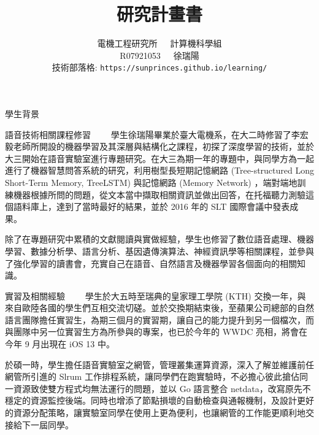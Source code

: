\documentclass[12pt,UTF8,fntef]{article}
\title{研究計畫書}
\author{電機工程研究所~~~計算機科學組\\R07921053~~~徐瑞陽 \\ 技術部落格: \texttt{https://sunprinces.github.io/learning/}}
\date{}
\begin{document}
\maketitle

\begin{section}{學生背景}
  \begin{subsection}{語音技術相關課程修習}
~~~~學生徐瑞陽畢業於臺大電機系，在大二時修習了李宏毅老師所開設的機器學習及其深層與結構化之課程，初探了深度學習的技術，並於大三開始在語音實驗室進行專題研究。在大三為期一年的專題中，與同學方為一起進行了機器智慧問答系統的研究，利用樹型長短期記憶網路 (Tree-structured Long Short-Term Memory, TreeLSTM) 與記憶網路 (Memory Network) ，端對端地訓練機器根據所問的問題，從文本當中擷取相關資訊並做出回答，在托福聽力測驗這個語料庫上，達到了當時最好的結果，並於 2016 年的 SLT 國際會議中發表成果。

    除了在專題研究中累積的文獻閱讀與實做經驗，學生也修習了數位語音處理、機器學習、數據分析學、語言分析、基因遺傳演算法、神經資訊學等相關課程，並參與了強化學習的讀書會，充實自己在語音、自然語言及機器學習各個面向的相關知識。
  \end{subsection}

  \begin{subsection}{實習及相關經驗}
    ~~~~學生於大五時至瑞典的皇家理工學院 (KTH) 交換一年，與來自歐陸各國的學生們互相交流切磋。並於交換期結束後，至蘋果公司總部的自然語言團隊擔任實習生，為期三個月的實習期，讓自己的能力提升到另一個檔次，而與團隊中另一位實習生方為所參與的專案，也已於今年的 WWDC 亮相，將會在今年 9 月出現在 iOS 13 中。

    於碩一時，學生擔任語音實驗室之網管，管理叢集運算資源，深入了解並維護前任網管所引進的 Slrum 工作排程系統，讓同學們在跑實驗時，不必擔心彼此搶佔同一資源致使雙方程式均無法運行的問題，並以 Go 語言整合 netdata，改寫原先不穩定的資源監控後端。同時也增添了節點損壞的自動檢查與通報機制，及設計更好的資源分配策略，讓實驗室同學在使用上更為便利，也讓網管的工作能更順利地交接給下一屆同學。
  \end{subsection}
\end{section}
\end{document}
